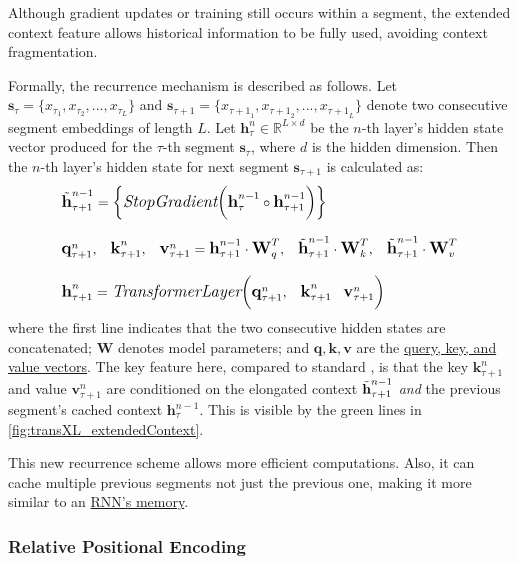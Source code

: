 Although gradient updates or training still occurs within a segment, the extended context feature allows historical information to be fully used, avoiding context fragmentation. 

Formally, the recurrence mechanism is described as follows. Let $\textbf{s}_\tau = \Big\{ x_{\tau_1}, x_{\tau_2}, ..., x_{\tau_L} \Big\}$ and $\textbf{s}_{\tau + 1} = \Big\{ x_{{\tau+1}_1}, x_{{\tau+1}_2}, ..., x_{{\tau+1}_L} \Big\}$ denote two consecutive segment embeddings of length $L$. Let $\textbf{h}_\tau^n \in \mathbb{R}^{L \times d}$ be the $n$-th layer's hidden state vector produced for the $\tau$-th segment $\textbf{s}_\tau$, where $d$ is the hidden dimension. Then the $n$-th layer's hidden state for next segment $\textbf{s}_{\tau + 1}$ is calculated as:
$$
\begin{array}{ll}
\large \Tilde{\textbf{h}}_{\tau + 1}^{n-1} = \Big\{ \textit{StopGradient}\Big( \textbf{h}_\tau^{n-1} \circ \textbf{h}_{\tau+1}^{n-1} \Big) \Big\} \\\\
%
\large \textbf{q}_{\tau+1}^n, \;\;\; \textbf{k}_{\tau+1}^n, \;\;\; \textbf{v}_{\tau+1}^n = \textbf{h}_{\tau+1}^{n-1} \cdot \textbf{W}_q^T, \;\;\; \Tilde{\textbf{h}}_{\tau+1}^{n-1} \cdot \textbf{W}_k^T, \;\;\; \Tilde{\textbf{h}}_{\tau+1}^{n-1} \cdot \textbf{W}_v^T \\\\
%
\large \textbf{h}_{\tau+1}^n = \textit{TransformerLayer} \Big( \textbf{q}_{\tau+1}^n, \;\;\; \textbf{k}_{\tau+1}^n \;\;\; \textbf{v}_{\tau+1}^n \Big)
\end{array}
$$
where the first line indicates that the two consecutive hidden states are concatenated; $\textbf{W}$ denotes model parameters; and $\textbf{q}, \textbf{k}, \textbf{v}$ are the \hyperref[sec:QKV]{query, key, and value vectors}. The key feature here, compared to standard , is that the key $\textbf{k}_{\tau+1}^n$ and value $\textbf{v}_{\tau+1}^n$ are conditioned on the elongated context $\Tilde{\textbf{h}}_{\tau+1}^{n-1}$ \emph{and} the previous segment's cached context $\textbf{h}_\tau^{n-1}$. This is visible by the green lines in \cref{fig:transXL_extendedContext}.  

This new recurrence scheme allows more efficient computations. Also, it can cache multiple previous segments not just the previous one, making it more similar to an \hyperref[sec:RNN]{RNN's memory}. 


\subsubsection{Relative Positional Encoding} \label{sec:RelativePosEnc}

